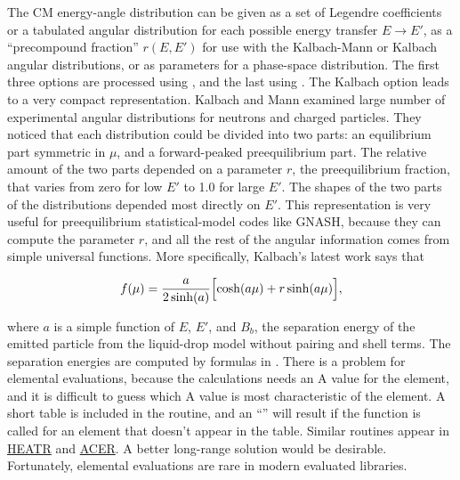 The CM energy-angle distribution can be given as a set of Legendre
coefficients or a tabulated angular distribution for each
possible energy transfer $E{\rightarrow}E'$, as a ``precompound fraction''
$r(E,E')$ for use with the
Kalbach-Mann\cite{km}
or Kalbach\cite{k86} angular
distributions, or as parameters for a phase-space distribution.  The first three options are processed using
, and the last using
.  The Kalbach  option
leads to a very compact representation.  Kalbach and Mann examined
large number of experimental angular distributions for neutrons
and charged particles.  They noticed that each distribution could
be divided into two parts: an equilibrium part symmetric in $\mu$,
and a forward-peaked preequilibrium part.  The relative amount of
the two parts depended on a parameter $r$, the preequilibrium fraction,
 that varies from zero for low $E'$ to 1.0
for large $E'$.  The shapes of the two parts of the distributions
depended most directly on $E'$.  This representation is very useful
for preequilibrium statistical-model codes like
GNASH\cite{GNASH}, because they can compute the
parameter $r$, and all the rest of the angular information comes
from simple universal functions.   More specifically,
Kalbach's latest work says that

\begin{equation}
   f(\mu)=\frac{a}{2\sinh(a)}\Bigl[\cosh(a\mu)+r\sinh(a\mu)\Bigr],
\end{equation}

\noindent
where $a$ is a simple function of $E$, $E'$, and $B_b$, the separation
energy of the emitted particle from the liquid-drop model without
pairing and shell terms.  The separation energies
are computed by formulas in .  There
is a problem for elemental evaluations, because the calculations needs
an A value for the element, and it is difficult to guess which A value
is most characteristic of the element.  A short table is included in
the routine, and an ``'' will result if the
function is called for an element that doesn't appear
in the table.  Similar routines appear in
\hyperlink{sHEATRhy}{HEATR} and
\hyperlink{sACERhy}{ACER}.  A better
long-range solution would be desirable.
Fortunately, elemental evaluations are rare in modern
evaluated libraries.

